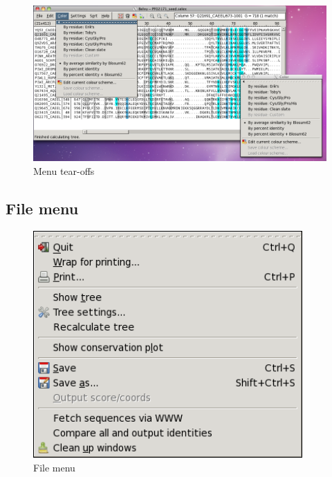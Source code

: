 \documentclass[letterpaper]{article}
\begin{document}
\begin{figure}[htb]
\centering
\color{lightblue}
\includegraphics[width=\textwidth]{img_menu_tear_offs.png}
\caption{Menu tear-offs}
\label{fig:menu_tear_offs}
\end{figure}


\subsection[File menu]{File menu}

\begin{figure}[htb]
\centering
\color{lightblue}
\includegraphics[width=10.3cm]{img_menu_file.png}
\caption{File menu}
\label{fig:file_menu}
\end{figure}
\end{document}
